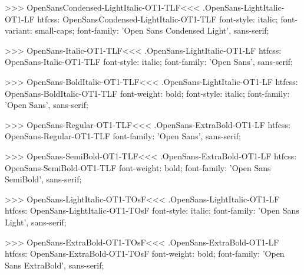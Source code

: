 >>>
\<OpenSansCondensed-LightItalic-OT1-TLF\><<<
.OpenSans-LightItalic-OT1-LF
htfcss:  OpenSansCondensed-LightItalic-OT1-TLF  font-style: italic; font-variant: small-caps; font-family: 'Open Sans Condensed Light', sans-serif;

>>>
\<OpenSans-Italic-OT1-TLF\><<<
.OpenSans-LightItalic-OT1-LF
htfcss:  OpenSans-Italic-OT1-TLF  font-style: italic; font-family: 'Open Sans', sans-serif;

>>>
\<OpenSans-BoldItalic-OT1-TLF\><<<
.OpenSans-LightItalic-OT1-LF
htfcss:  OpenSans-BoldItalic-OT1-TLF  font-weight: bold; font-style: italic; font-family: 'Open Sans', sans-serif;

>>>
\<OpenSans-Regular-OT1-TLF\><<<
.OpenSans-ExtraBold-OT1-LF
htfcss:  OpenSans-Regular-OT1-TLF  font-family: 'Open Sans', sans-serif;

>>>
\<OpenSans-SemiBold-OT1-TLF\><<<
.OpenSans-ExtraBold-OT1-LF
htfcss:  OpenSans-SemiBold-OT1-TLF  font-weight: bold; font-family: 'Open Sans SemiBold', sans-serif;

>>>
\<OpenSans-LightItalic-OT1-TOsF\><<<
.OpenSans-LightItalic-OT1-LF
htfcss:  OpenSans-LightItalic-OT1-TOsF  font-style: italic; font-family: 'Open Sans Light', sans-serif;

>>>
\<OpenSans-ExtraBold-OT1-TOsF\><<<
.OpenSans-ExtraBold-OT1-LF
htfcss:  OpenSans-ExtraBold-OT1-TOsF  font-weight: bold; font-family: 'Open Sans ExtraBold', sans-serif;


